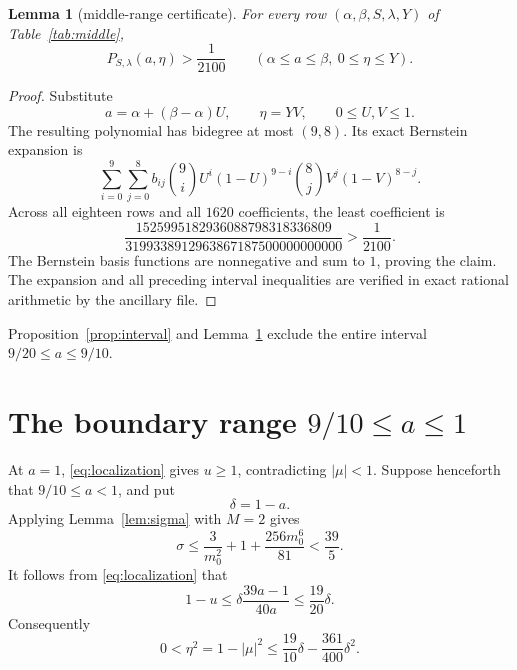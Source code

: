 \documentclass[11pt]{article}
\newtheorem{lemma}[theorem]{Lemma}
\theoremstyle{remark}
\begin{document}
\begin{lemma}[middle-range certificate]\label{lem:middle-cert}
For every row $(\alpha,\beta,S,\lambda,Y)$ of
Table~\ref{tab:middle},
\[
 P_{S,\lambda}(a,\eta)>\frac1{2100}
 \qquad
 (\alpha\le a\le\beta,\ 0\le\eta\le Y).
\]
\end{lemma}

\begin{proof}
Substitute
\[
 a=\alpha+(\beta-\alpha)U,
 \qquad
 \eta=YV,
 \qquad 0\le U,V\le1.
\]
The resulting polynomial has bidegree at most $(9,8)$.  Its exact
Bernstein expansion is
\[
 \sum_{i=0}^{9}\sum_{j=0}^{8}b_{ij}
 \binom9iU^i(1-U)^{9-i}
 \binom8jV^j(1-V)^{8-j}.
\]
Across all eighteen rows and all $1620$ coefficients, the least coefficient is
\[
 \frac{1525995182936088798318336809}
 {3199338912963867187500000000000}
 >\frac1{2100}.
\]
The Bernstein basis functions are nonnegative and sum to $1$, proving the
claim.  The expansion and all preceding interval inequalities are verified in
exact rational arithmetic by the ancillary file.
\end{proof}

Proposition~\ref{prop:interval} and Lemma~\ref{lem:middle-cert} exclude the
entire interval $9/20\le a\le9/10$.

\section{The boundary range \texorpdfstring{$9/10\le a\le1$}{9/10 <= a <= 1}}

At $a=1$, \eqref{eq:localization} gives $u\ge1$, contradicting
$|\mu|<1$.  Suppose henceforth that $9/10\le a<1$, and put
\[
 \delta=1-a.
\]
Applying Lemma~\ref{lem:sigma} with $M=2$ gives
\begin{equation}\label{eq:end-sigma}
 \sigma\le\frac3{m_0^2}+1+\frac{256m_0^6}{81}<\frac{39}{5}.
\end{equation}
It follows from \eqref{eq:localization} that
\begin{equation}\label{eq:end-u}
 1-u\le\delta\frac{39a-1}{40a}\le\frac{19}{20}\delta.
\end{equation}
Consequently
\begin{equation}\label{eq:end-eta}
 0<\eta^2=1-|\mu|^2
 \le\frac{19}{10}\delta-\frac{361}{400}\delta^2.
\end{equation}
\end{document}
